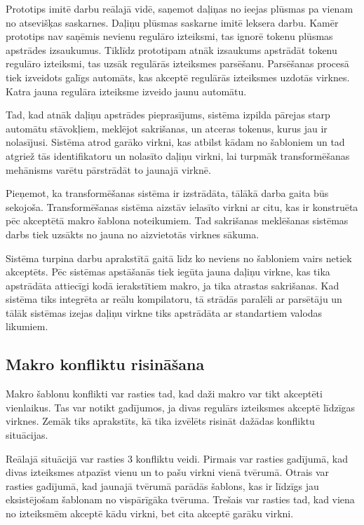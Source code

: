 Prototips imitē darbu reālajā vidē, saņemot daļiņas no ieejas plūsmas pa vienam no atsevišķas saskarnes. Daļiņu plūsmas saskarne imitē leksera darbu. Kamēr prototips nav saņēmis nevienu regulāro izteiksmi, tas ignorē tokenu plūsmas apstrādes izsaukumus. Tiklīdz prototipam atnāk izsaukums apstrādāt tokenu regulāro izteiksmi, tas uzsāk regulārās izteiksmes parsēšanu. Parsēšanas procesā tiek izveidots galīgs automāts, kas akceptē regulārās izteiksmes uzdotās virknes. Katra jauna regulāra izteiksme izveido jaunu automātu.

Tad, kad atnāk daļiņu apstrādes pieprasījums, sistēma izpilda pārejas starp automātu stāvokļiem, meklējot sakrišanas, un atceras tokenus, kurus jau ir nolasījusi. Sistēma atrod garāko virkni, kas atbilst kādam no šabloniem un tad atgriež tās identifikatoru un nolasīto daļiņu virkni, lai turpmāk transformēšanas mehānisms varētu pārstrādāt to jaunajā virknē.

Pieņemot, ka transformēšanas sistēma ir izstrādāta, tālākā darba gaita būs sekojoša. Transformēšanas sistēma aizstāv ielasīto virkni ar citu, kas ir konstruēta pēc akceptētā makro šablona noteikumiem. Tad sakrišanas meklēšanas sistēmas darbs tiek uzsākts no jauna no aizvietotās virknes sākuma.

Sistēma turpina darbu aprakstītā gaitā līdz ko neviens no šabloniem vairs netiek akceptēts. Pēc sistēmas apstāšanās tiek iegūta jauna daļiņu virkne, kas tika apstrādāta attiecīgi kodā ierakstītiem makro, ja tika atrastas sakrišanas. Kad sistēma tiks integrēta ar reālu kompilatoru, tā strādās paralēli ar parsētāju un tālāk sistēmas izejas daļiņu virkne tiks apstrādāta ar standartiem valodas likumiem.

\subsection{\label{sbs:prot_conflictresolving}Makro konfliktu risināšana}
Makro šablonu konflikti var rasties tad, kad daži makro var tikt akceptēti vienlaikus. Tas var notikt gadījumos, ja divas regulārs izteiksmes akceptē līdzīgas virknes. Zemāk tiks aprakstīts, kā tika izvēlēts risināt dažādas konfliktu situācijas. 

Reālajā situācijā var rasties 3 konfliktu veidi. Pirmais var rasties gadījumā, kad divas izteiksmes atpazīst vienu un to pašu virkni vienā tvērumā. Otrais var rasties gadījumā, kad jaunajā tvērumā parādās šablons, kas ir līdzīgs jau eksistējošam šablonam no vispārīgāka tvēruma. Trešais var rasties tad, kad viena no izteiksmēm akceptē kādu virkni, bet cita akceptē garāku virkni.

